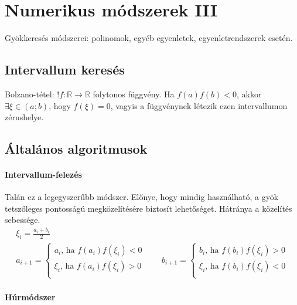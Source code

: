 \documentclass[../../main.tex]{subfiles}
\begin{document}
\section{Numerikus módszerek III}

\begin{fulltheorem}
  Gyökkeresés módszerei: polinomok, egyéb egyenletek, egyenletrendszerek esetén.
\end{fulltheorem}

\subsection{Intervallum keresés}

Bolzano-tétel: $!f: \mathbb R \rightarrow \mathbb R$ folytonos függvény.
Ha $f(a) f(b) < 0$, akkor $\exists \xi \in (a;b)$, hogy $f(\xi) = 0$,
vagyis a függvénynek létezik ezen intervallumon zérushelye.

\subsection{Általános algoritmusok}

\paragraph{Intervallum-felezés}

Talán ez a legegyszerűbb módszer. Előnye, hogy mindig használható, a gyök
tetszőleges pontosságú megközelítésére biztosít lehetőséget. Hátránya a
közelítés sebessége.
\begin{gather*}
  \xi_i = \frac{a_i + b_i}{2}
  \\
  a_{i+1} = \begin{cases}
    a_i \text{, ha } f(a_i)f(\xi_i) < 0   \\
    \xi_i \text{, ha } f(a_i)f(\xi_i) > 0 \\
  \end{cases}
  \qquad
  b_{i+1} = \begin{cases}
    b_i \text{, ha } f(b_i)f(\xi_i) > 0   \\
    \xi_i \text{, ha } f(b_i)f(\xi_i) < 0 \\
  \end{cases}
\end{gather*}

\paragraph{Húrmódszer}
\end{document}
